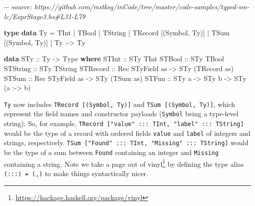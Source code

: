 \documentclass[]{article}
\newenvironment{Shaded}{}{}
\newcommand{\CommentTok}[1]{\textcolor[rgb]{0.38,0.63,0.69}{\textit{#1}}}
\newcommand{\DataTypeTok}[1]{\textcolor[rgb]{0.56,0.13,0.00}{#1}}
\newcommand{\KeywordTok}[1]{\textcolor[rgb]{0.00,0.44,0.13}{\textbf{#1}}}
\newcommand{\NormalTok}[1]{#1}
\newcommand{\OperatorTok}[1]{\textcolor[rgb]{0.40,0.40,0.40}{#1}}
\newcommand{\OtherTok}[1]{\textcolor[rgb]{0.00,0.44,0.13}{#1}}
\renewcommand{\href}[2]{#2\footnote{\url{#1}}}
\begin{document}
\begin{Shaded}
\begin{Highlighting}[]
\CommentTok{{-}{-} source: https://github.com/mstksg/inCode/tree/master/code{-}samples/typed{-}sm{-}lc/ExprStage3.hs\#L31{-}L79}

\KeywordTok{type} \KeywordTok{data} \DataTypeTok{Ty}
  \OtherTok{=} \DataTypeTok{TInt}
  \OperatorTok{|} \DataTypeTok{TBool}
  \OperatorTok{|} \DataTypeTok{TString}
  \OperatorTok{|} \DataTypeTok{TRecord}\NormalTok{ [(}\DataTypeTok{Symbol}\NormalTok{, }\DataTypeTok{Ty}\NormalTok{)]}
  \OperatorTok{|} \DataTypeTok{TSum}\NormalTok{ [(}\DataTypeTok{Symbol}\NormalTok{, }\DataTypeTok{Ty}\NormalTok{)]}
  \OperatorTok{|} \DataTypeTok{Ty} \OperatorTok{:{-}\textgreater{}} \DataTypeTok{Ty}

\KeywordTok{data} \DataTypeTok{STy}\OtherTok{ ::} \DataTypeTok{Ty} \OtherTok{{-}\textgreater{}} \DataTypeTok{Type} \KeywordTok{where}
  \DataTypeTok{STInt}\OtherTok{ ::} \DataTypeTok{STy} \DataTypeTok{TInt}
  \DataTypeTok{STBool}\OtherTok{ ::} \DataTypeTok{STy} \DataTypeTok{TBool}
  \DataTypeTok{STString}\OtherTok{ ::} \DataTypeTok{STy} \DataTypeTok{TString}
  \DataTypeTok{STRecord}\OtherTok{ ::} \DataTypeTok{Rec} \DataTypeTok{STyField}\NormalTok{ as }\OtherTok{{-}\textgreater{}} \DataTypeTok{STy}\NormalTok{ (}\DataTypeTok{TRecord}\NormalTok{ as)}
  \DataTypeTok{STSum}\OtherTok{ ::} \DataTypeTok{Rec} \DataTypeTok{STyField}\NormalTok{ as }\OtherTok{{-}\textgreater{}} \DataTypeTok{STy}\NormalTok{ (}\DataTypeTok{TSum}\NormalTok{ as)}
  \DataTypeTok{STFun}\OtherTok{ ::} \DataTypeTok{STy}\NormalTok{ a }\OtherTok{{-}\textgreater{}} \DataTypeTok{STy}\NormalTok{ b }\OtherTok{{-}\textgreater{}} \DataTypeTok{STy}\NormalTok{ (a }\OperatorTok{:{-}\textgreater{}}\NormalTok{ b)}
\end{Highlighting}
\end{Shaded}

\texttt{Ty} now includes \texttt{TRecord\ {[}(Symbol,\ Ty){]}} and
\texttt{TSum\ {[}(Symbol,\ Ty){]}}, which represent the field names and
constructor payloads (\texttt{Symbol} being a type-level string). So, for
example, \texttt{TRecord\ {[}"value"\ :::\ TInt,\ "label"\ :::\ TString{]}}
would be the type of a record with ordered fields \texttt{value} and
\texttt{label} of integers and strings, respectively.
\texttt{TSum\ {[}"Found"\ :::\ TInt,\ "Missing"\ :::\ TString{]}} would be the
type of a sum between \texttt{Found} containing an integer and \texttt{Missing}
containing a string. Note we take a page out of
\href{https://hackage.haskell.org/package/vinyl}{vinyl} by defining the type
alias \texttt{(:::)\ =\ \textquotesingle{}(,)} to make things syntactically
nicer.
\end{document}
